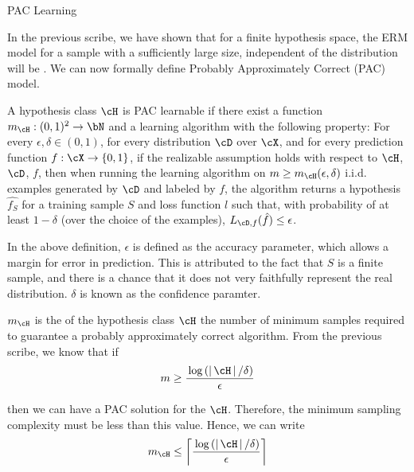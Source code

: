 \documentclass[11pt,a4paper]{article}
\begin{document}
\makeheader%

\begin{ssection}{PAC Learning}

	In the previous scribe, we have shown that for a finite hypothesis space, the ERM model for a sample with a sufficiently large size, independent of the distribution will be . We can now formally define Probably Approximately Correct (PAC) model.

	\begin{definition}
		A hypothesis class $\cH$ is PAC learnable if there exist a function $m_\cH : (0, 1)^2 \ra \bN$ and a learning algorithm with the following property: For every $\epsilon, \delta \in (0, 1)$, for every distribution $\cD$ over $\cX$, and for every prediction function $f : \cX \ra \set{0, 1}$, if the realizable assumption holds with respect to $\cH$, $\cD$, $f$, then when running the learning algorithm on $m \ge m_\cH (\epsilon, \delta)$ i.i.d. examples generated by $\cD$ and labeled by $f$, the algorithm returns a hypothesis $\hat{f_S}$ for a training sample $S$ and loss function $l$ such that, with probability of at least $1 - \delta$ (over the choice of the examples), $L_{\cD, f}(\hat{f}) \le \epsilon$.
	\end{definition}

	In the above definition, $\epsilon$ is defined as the accuracy parameter, which allows a margin for error in prediction. This is attributed to the fact that $S$ is a finite sample, and there is a chance that it does not very faithfully represent the real distribution. $\delta$ is known as the confidence paramter. \br

	$m_\cH$ is the  of the hypothesis class $\cH$  the number of minimum samples required to guarantee a probably approximately correct algorithm. From the previous scribe, we know that if
	\begin{equation}
		m \ge \frac{\log{\abs{\cH} / \delta}}{\epsilon}
	\end{equation}

	then we can have a PAC solution for the $\cH$. Therefore, the minimum sampling complexity must be less than this value. Hence, we can write
	\begin{equation}
		m_\cH	\le	\ceil{\frac{\log{\abs{\cH} / \delta}}{\epsilon}}
		\label{eq:sampling-complexity}
	\end{equation}

\end{ssection}
\end{document}
